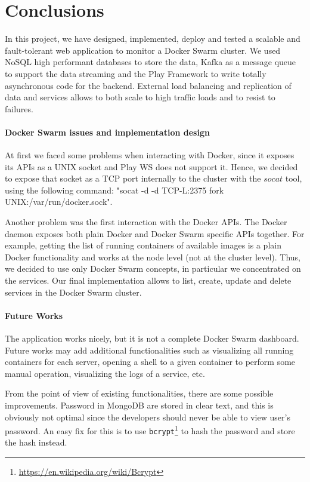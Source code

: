 \section{Conclusions}
\label{sec:conclusions}

In this project, we have designed, implemented, deploy and tested a scalable and fault-tolerant web application to monitor a Docker Swarm cluster.
We used NoSQL high performant databases to store the data, Kafka as a message queue to support the data streaming and the Play Framework to write totally asynchronous code for the backend.
External load balancing and replication of data and services allows to both scale to high traffic loads and to resist to failures.

\paragraph{Docker Swarm issues and implementation design}
At first we faced some problems when interacting with Docker, since it exposes its APIs as a UNIX socket and Play WS does not support it.
Hence, we decided to expose that socket as a TCP port internally to the cluster with the $socat$ tool, using the following command: "socat -d  -d TCP-L:2375 fork UNIX:/var/run/docker.sock".

Another problem was the first interaction with the Docker APIs.
The Docker daemon exposes both plain Docker and Docker Swarm specific APIs together.
For example, getting the list of running containers of available images is a plain Docker functionality and works at the node level (not at the cluster level).
Thus, we decided to use only Docker Swarm concepts, in particular we concentrated on the services.
Our final implementation allows to list, create, update and delete services in the Docker Swarm cluster.

\paragraph{Future Works}
The application works nicely, but it is not a complete Docker Swarm dashboard.
Future works may add additional functionalities such as visualizing all running containers for each server, opening a shell to a given container to perform some manual operation, visualizing the logs of a service, etc.

From the point of view of existing functionalities, there are some possible improvements.
Password in MongoDB are stored in clear text, and this is obviously not optimal since the developers should never be able to view user's password.
An easy fix for this is to use \texttt{bcrypt}\footnote{\url{https://en.wikipedia.org/wiki/Bcrypt}} to hash the password and store the hash instead.

